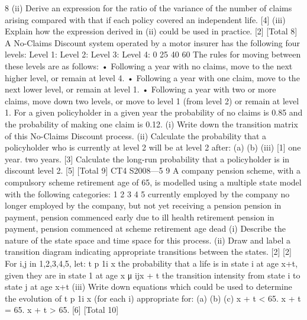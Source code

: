 \documentclass[a4paper,12pt]{article}
\begin{document}
\begin{enumerate}
8
(ii) Derive an expression for the ratio of the variance of the number of claims
arising compared with that if each policy covered an independent life.
[4]
(iii) Explain how the expression derived in (ii) could be used in practice.
[2]
[Total 8]
A No-Claims Discount system operated by a motor insurer has the following four
levels:
Level 1:
Level 2:
Level 3:
Level 4:
0%
25%
40%
60%
The rules for moving between these levels are as follows:
• Following a year with no claims, move to the next higher level, or remain at
level 4.
• Following a year with one claim, move to the next lower level, or remain at
level 1.
• Following a year with two or more claims, move down two levels, or move to
level 1 (from level 2) or remain at level 1.
For a given policyholder in a given year the probability of no claims is 0.85 and the
probability of making one claim is 0.12.
(i) Write down the transition matrix of this No-Claims Discount process.
(ii) Calculate the probability that a policyholder who is currently at level 2 will be
at level 2 after:
(a)
(b)
(iii)
[1]
one year.
two years.
[3]
Calculate the long-run probability that a policyholder is in discount level 2.
[5]
[Total 9]
CT4 S2008—5
9
A company pension scheme, with a compulsory scheme retirement age of 65, is
modelled using a multiple state model with the following categories:
1
2
3
4
5 currently employed by the company
no longer employed by the company, but not yet receiving a pension
pension in payment, pension commenced early due to ill health retirement
pension in payment, pension commenced at scheme retirement age
dead
(i) Describe the nature of the state space and time space for this process.
(ii) Draw and label a transition diagram indicating appropriate transitions between
the states.
[2]
[2]
For i,j in {1,2,3,4,5}, let:
t
p 1i x
the probability that a life is in state i at age x+t, given they are in state 1 at age
x
μ ijx + t the transition intensity from state i to state j at age x+t
(iii) Write down equations which could be used to determine the evolution of t p 1i x
(for each i) appropriate for:
(a)
(b)
(c)
x + t < 65.
x + t = 65.
x + t > 65.
[6]
[Total 10]


\end{enumerate}
\end{document}
